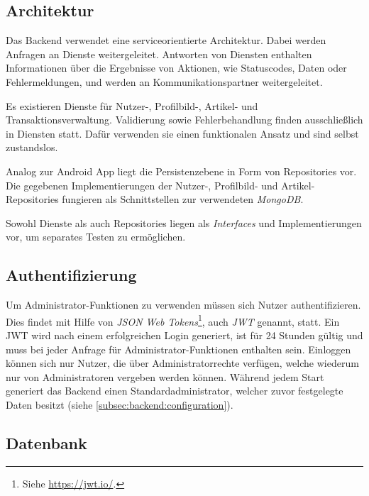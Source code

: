 \documentclass[a4paper, 11pt]{article}
\begin{document}
\subsection{Architektur}
\label{subsec:backend:architecture}
Das Backend verwendet eine serviceorientierte Architektur.
Dabei werden Anfragen an Dienste weitergeleitet.
Antworten von Diensten enthalten Informationen über die Ergebnisse von Aktionen, wie Statuscodes, Daten oder Fehlermeldungen, und werden an Kommunikationspartner weitergeleitet.

Es existieren Dienste für Nutzer-, Profilbild-, Artikel- und Transaktionsverwaltung.
Validierung sowie Fehlerbehandlung finden ausschließlich in Diensten statt.
Dafür verwenden sie einen funktionalen Ansatz und sind selbst zustandslos.

Analog zur Android App liegt die Persistenzebene in Form von Repositories vor.
Die gegebenen Implementierungen der Nutzer-, Profilbild- und Artikel-Repositories fungieren als Schnittstellen zur verwendeten \textit{MongoDB}.

Sowohl Dienste als auch Repositories liegen als \textit{Interfaces} und Implementierungen vor, um separates Testen zu ermöglichen.

\subsection{Authentifizierung}
\label{subsec:backend:authentication}
Um Administrator-Funktionen zu verwenden müssen sich Nutzer authentifizieren.
Dies findet mit Hilfe von \textit{JSON Web Tokens}\footnote{Siehe \url{https://jwt.io/}.}, auch \textit{JWT} genannt, statt.
Ein JWT wird nach einem erfolgreichen Login generiert, ist für 24 Stunden gültig und muss bei jeder Anfrage für Administrator-Funktionen enthalten sein.
Einloggen können sich nur Nutzer, die über Administratorrechte verfügen, welche wiederum nur von Administratoren vergeben werden können.
Während jedem Start generiert das Backend einen Standard\-administrator, welcher zuvor festgelegte Daten besitzt (siehe \autoref{subsec:backend:configuration}).

\subsection{Datenbank}
\label{subsec:backend:database}
\end{document}
